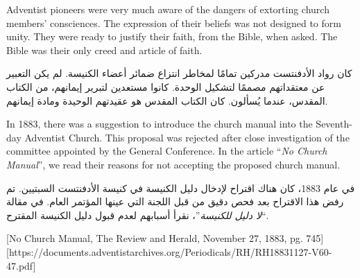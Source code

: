 Adventist pioneers were very much aware of the dangers of extorting church members’ consciences. The expression of their beliefs was not designed to form unity. They were ready to justify their faith, from the Bible, when asked. The Bible was their only creed and article of faith.


كان رواد الأدفنتست مدركين تمامًا لمخاطر انتزاع ضمائر أعضاء الكنيسة. لم يكن التعبير عن معتقداتهم مصممًا لتشكيل الوحدة. كانوا مستعدين لتبرير إيمانهم، من الكتاب المقدس، عندما يُسألون. كان الكتاب المقدس هو عقيدتهم الوحيدة ومادة إيمانهم.


In 1883, there was a suggestion to introduce the church manual into the Seventh-day Adventist Church. This proposal was rejected after close investigation of the committee appointed by the General Conference. In the article “\textit{No Church Manual}”, we read their reasons for not accepting the proposed church manual.


في عام 1883، كان هناك اقتراح لإدخال دليل الكنيسة في كنيسة الأدفنتست السبتيين. تم رفض هذا الاقتراح بعد فحص دقيق من قبل اللجنة التي عينها المؤتمر العام. في مقالة “\textit{لا دليل للكنيسة}”، نقرأ أسبابهم لعدم قبول دليل الكنيسة المقترح.


[No Church Manual, The Review and Herald, November 27, 1883, pg. 745][https://documents.adventistarchives.org/Periodicals/RH/RH18831127-V60-47.pdf]


